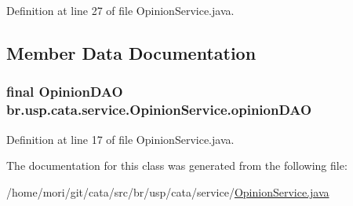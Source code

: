 Definition at line 27 of file Opinion\+Service.\+java.



\subsection{Member Data Documentation}
\hypertarget{classbr_1_1usp_1_1cata_1_1service_1_1_opinion_service_abdc571daedcdd5dba16c48305604d287}{
\subsubsection[{opinion\+D\+A\+O}]{\setlength{\rightskip}{0pt plus 5cm}final {\bf Opinion\+D\+A\+O} br.\+usp.\+cata.\+service.\+Opinion\+Service.\+opinion\+D\+A\+O\hspace{0.3cm}{\ttfamily [private]}}}\label{classbr_1_1usp_1_1cata_1_1service_1_1_opinion_service_abdc571daedcdd5dba16c48305604d287}


Definition at line 17 of file Opinion\+Service.\+java.



The documentation for this class was generated from the following file\+:\begin{DoxyCompactItemize}
\item 
/home/mori/git/cata/src/br/usp/cata/service/\hyperlink{_opinion_service_8java}{Opinion\+Service.\+java}\end{DoxyCompactItemize}
